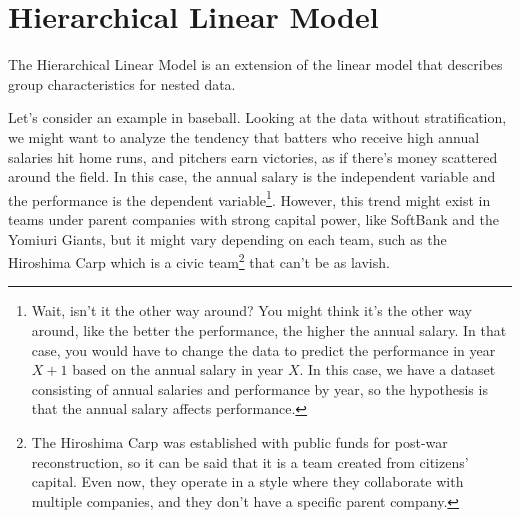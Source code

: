 \documentclass{ltjsbook}
\begin{document}
\section{Hierarchical Linear Model}
The Hierarchical Linear Model is an extension of the linear model that describes group characteristics for nested data.


Let's consider an example in baseball. Looking at the data without stratification, we might want to analyze the tendency that batters who receive high annual salaries hit home runs, and pitchers earn victories, as if there's money scattered around the field. In this case, the annual salary is the independent variable and the performance is the dependent variable\footnote{Wait, isn't it the other way around? You might think it's the other way around, like the better the performance, the higher the annual salary. In that case, you would have to change the data to predict the performance in year $X+1$ based on the annual salary in year $X$. In this case, we have a dataset consisting of annual salaries and performance by year, so the hypothesis is that the annual salary affects performance.}. However, this trend might exist in teams under parent companies with strong capital power, like SoftBank and the Yomiuri Giants, but it might vary depending on each team, such as the Hiroshima Carp which is a civic team\footnote{The Hiroshima Carp was established with public funds for post-war reconstruction, so it can be said that it is a team created from citizens' capital. Even now, they operate in a style where they collaborate with multiple companies, and they don't have a specific parent company.} that can't be as lavish.
\end{document}
